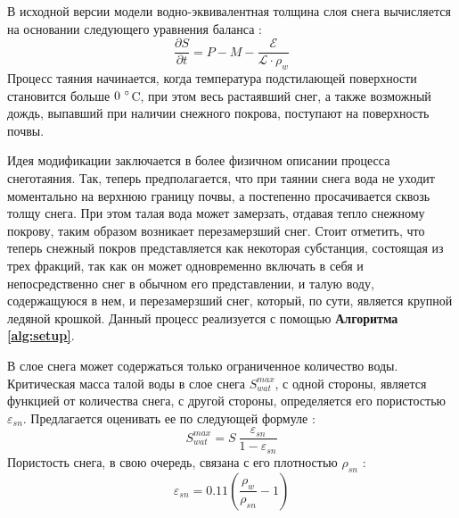 \documentclass[a4paper, fontsize=14pt]{scrartcl}
\begin{document}
В исходной версии модели водно-эквивалентная толщина слоя снега вычисляется на основании следующего уравнения баланса \cite{Volodin1998, Volodina2000}:
\begin{equation}
    \dfrac{\partial S}{\partial t} = P - M - \dfrac{\mathcal{E}}{\mathcal{L} \cdot \rho_w}  \label{sys}
\end{equation}
Процесс таяния начинается, когда температура подстилающей поверхности становится больше $0 ~\degree$C, при этом весь растаявший снег, а также возможный дождь, выпавший при наличии снежного покрова, поступают на поверхность почвы.

Идея модификации заключается в более физичном описании процесса снеготаяния. Так, теперь предполагается, что при таянии снега вода не уходит моментально на верхнюю границу почвы, а постепенно просачивается сквозь толщу снега. При этом талая вода может замерзать, отдавая тепло снежному покрову, таким образом возникает перезамерзший снег. Стоит отметить, что теперь снежный покров представляется как некоторая субстанция, состоящая из трех фракций, так как он может одновременно включать в себя и непосредственно снег в обычном его представлении, и талую воду, содержащуюся в нем, и перезамерзший снег, который, по сути, является крупной ледяной крошкой. Данный процесс реализуется с помощью \textbf{Алгоритма \ref{alg:setup}}.

В слое снега может содержаться только ограниченное количество воды. Критическая масса талой воды в слое снега $S_{wat}^{max}$, с одной стороны, является функцией от количества снега, с другой стороны, определяется его пористостью $\varepsilon_{sn}$. Предлагается оценивать ее по следующей формуле \cite{Gusev2002}:
\begin{equation}
     S_{wat}^{max} = S ~\dfrac{\varepsilon_{sn}}{1 - \varepsilon_{sn}}  \label{sys}  
\end{equation}
Пористость снега, в свою очередь, связана с его плотностью $\rho_{sn}$ \cite{Stock}:
\begin{equation}
    \varepsilon_{sn} = 0.11 \left( \dfrac{\rho_w}{\rho_{sn}} - 1 \right)  \label{sys}  
\end{equation}
\end{document}
